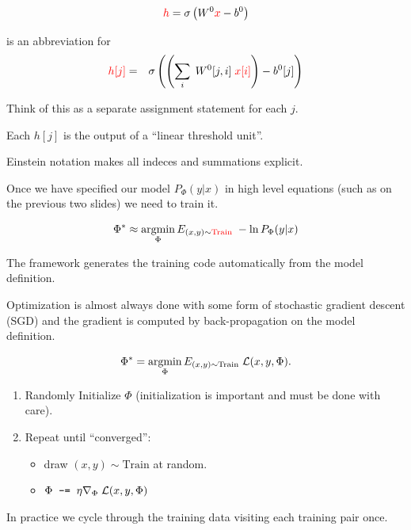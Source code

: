 {

$${\color{red} h} = \sigma\left(W^0{\color{red} x} - b^0\right)$$

\vfill
is an abbreviation for
\begin{eqnarray*}
  {\color{red} h[j]} & = & \sigma\left(\left(\sum_i\;W^0[j,i] \;{\color{red} x[i]}\right) - b^0[j]\right) 
\end{eqnarray*}

\vfill
Think of this as a separate assignment statement for each {\color{red} $j$}.

\vfill
Each {\color{red} $h[j]$} is the output of a ``linear threshold unit''.

\vfill
Einstein notation makes all indeces and summations explicit.


Once we have specified our model $P_\Phi(y|x)$ in high level equations (such as on the previous two slides) we need to train it.

$$\Phi^* \approx \operatorname*{argmin}_\Phi E_{(x,y) \sim {\color{red} \mathrm{Train}}} \; - \ln P_\Phi(y|x)$$

\vfill
The framework generates the training code automatically from the model definition.

\vfill
{\color{red} Optimization is almost always done with some form of stochastic gradient descent (SGD) and the gradient is computed
by back-propagation on the model definition.}

$$\Phi^* = \operatorname*{argmin}_\Phi E_{(x,y) \sim \mathrm{Train}} \; {\cal L}(x,y,\Phi).$$

\vfill
\begin{enumerate}
\item Randomly Initialize $\Phi$ (initialization is important and must be done with care).

  \vfill
  \item Repeat until ``converged'':

    \vfill
    \begin{itemize}
    \item draw $(x,y) \sim \mathrm{Train}$ at random.
      \vfill
    \item $\Phi \;\;\mbox{\tt -=}\;\; \eta \nabla_\Phi\;{\cal L}(x,y,\Phi)$
    \end{itemize}
\end{enumerate}


In practice we cycle through the training data visiting each training pair once.

}
